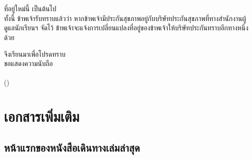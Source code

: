 \documentclass[a4paper,13pt]{article}
\begin{document}
\begin{itemize}[label={}]
  \indent\hspace{0.7in}\phantom{ที่อยู่ใหม่} \\
  \indent\hspace{0.7in}\phantom{ที่อยู่ใหม่} \\
  \indent\hspace{0.7in}ที่อยู่ใหม่นี้  เป็นต้นไป \\
  \indent\hspace{0.7in}ทั้งนี้ ข้าพเจ้ารับทราบแล้วว่า หากข้าพเจ้ามีประกันสุขภาพอยู่กับบริษัทประกันสุขภาพที่ทางสำนักงานผู้ดูแลนักเรียนฯ จัดไว้ ข้าพเจ้าจะแจ้งการเปลี่ยนแปลงที่อยู่ของข้าพเจ้าให้บริษัทประกันทราบอีกทางหนึ่งด้วย
\end{itemize}
จึงเรียนมาเพื่อโปรดทราบ \\

\noindent
\hspace{3.5in}ขอแสดงความนับถือ \\

\indent\hspace{2.6in} \\
\indent\hspace{2.9in}() \\

\newpage
\section{เอกสารเพิ่มเติม}
\subsection{หน้าแรกของหนังสือเดินทางเล่มล่าสุด}
% 
% 

\newpage
\end{document}

